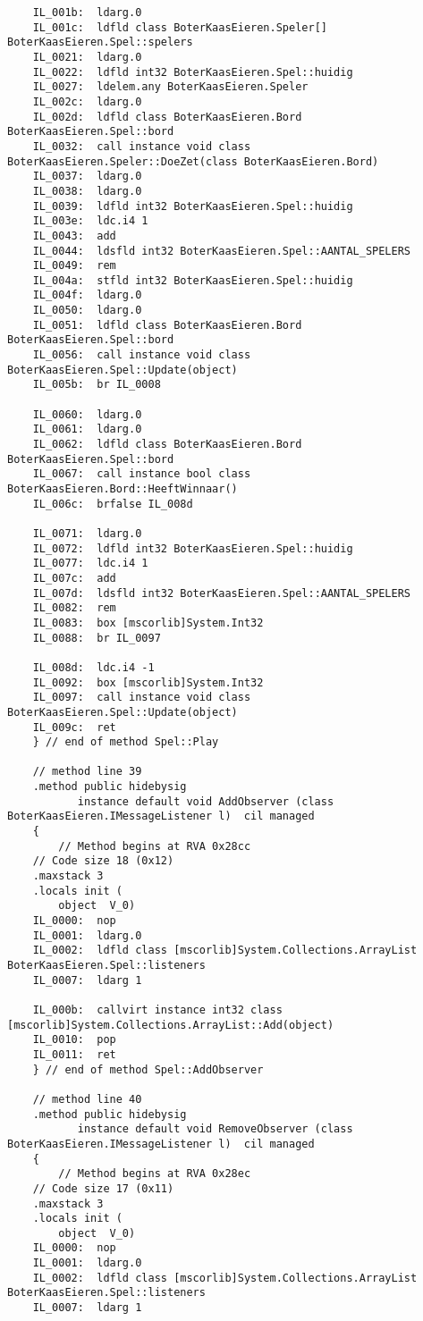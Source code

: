 \begin{lstlisting}
	IL_001b:  ldarg.0 
	IL_001c:  ldfld class BoterKaasEieren.Speler[] BoterKaasEieren.Spel::spelers
	IL_0021:  ldarg.0 
	IL_0022:  ldfld int32 BoterKaasEieren.Spel::huidig
	IL_0027:  ldelem.any BoterKaasEieren.Speler
	IL_002c:  ldarg.0 
	IL_002d:  ldfld class BoterKaasEieren.Bord BoterKaasEieren.Spel::bord
	IL_0032:  call instance void class BoterKaasEieren.Speler::DoeZet(class BoterKaasEieren.Bord)
	IL_0037:  ldarg.0 
	IL_0038:  ldarg.0 
	IL_0039:  ldfld int32 BoterKaasEieren.Spel::huidig
	IL_003e:  ldc.i4 1
	IL_0043:  add 
	IL_0044:  ldsfld int32 BoterKaasEieren.Spel::AANTAL_SPELERS
	IL_0049:  rem 
	IL_004a:  stfld int32 BoterKaasEieren.Spel::huidig
	IL_004f:  ldarg.0 
	IL_0050:  ldarg.0 
	IL_0051:  ldfld class BoterKaasEieren.Bord BoterKaasEieren.Spel::bord
	IL_0056:  call instance void class BoterKaasEieren.Spel::Update(object)
	IL_005b:  br IL_0008

	IL_0060:  ldarg.0 
	IL_0061:  ldarg.0 
	IL_0062:  ldfld class BoterKaasEieren.Bord BoterKaasEieren.Spel::bord
	IL_0067:  call instance bool class BoterKaasEieren.Bord::HeeftWinnaar()
	IL_006c:  brfalse IL_008d

	IL_0071:  ldarg.0 
	IL_0072:  ldfld int32 BoterKaasEieren.Spel::huidig
	IL_0077:  ldc.i4 1
	IL_007c:  add 
	IL_007d:  ldsfld int32 BoterKaasEieren.Spel::AANTAL_SPELERS
	IL_0082:  rem 
	IL_0083:  box [mscorlib]System.Int32
	IL_0088:  br IL_0097

	IL_008d:  ldc.i4 -1
	IL_0092:  box [mscorlib]System.Int32
	IL_0097:  call instance void class BoterKaasEieren.Spel::Update(object)
	IL_009c:  ret 
    } // end of method Spel::Play

    // method line 39
    .method public hidebysig 
           instance default void AddObserver (class BoterKaasEieren.IMessageListener l)  cil managed 
    {
        // Method begins at RVA 0x28cc
	// Code size 18 (0x12)
	.maxstack 3
	.locals init (
		object	V_0)
	IL_0000:  nop 
	IL_0001:  ldarg.0 
	IL_0002:  ldfld class [mscorlib]System.Collections.ArrayList BoterKaasEieren.Spel::listeners
	IL_0007:  ldarg 1

	IL_000b:  callvirt instance int32 class [mscorlib]System.Collections.ArrayList::Add(object)
	IL_0010:  pop 
	IL_0011:  ret 
    } // end of method Spel::AddObserver

    // method line 40
    .method public hidebysig 
           instance default void RemoveObserver (class BoterKaasEieren.IMessageListener l)  cil managed 
    {
        // Method begins at RVA 0x28ec
	// Code size 17 (0x11)
	.maxstack 3
	.locals init (
		object	V_0)
	IL_0000:  nop 
	IL_0001:  ldarg.0 
	IL_0002:  ldfld class [mscorlib]System.Collections.ArrayList BoterKaasEieren.Spel::listeners
	IL_0007:  ldarg 1


\end{lstlisting}
